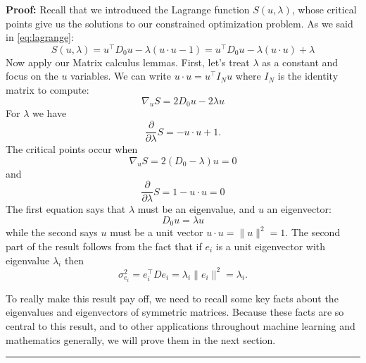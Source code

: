 \documentclass[]{article}
\begin{document}
\textbf{Proof:} Recall that we introduced the Lagrange function
\(S(u,\lambda)\), whose critical points give us the solutions to our
constrained optimization problem. As we said in \cref{eq:lagrange}: \[
S(u,\lambda) = u^{\intercal}D_{0}u - \lambda(u\cdot u - 1) = u^{\intercal}D_{0}u -\lambda(u\cdot u) + \lambda
\] Now apply our Matrix calculus lemmas. First, let's treat \(\lambda\)
as a constant and focus on the \(u\) variables. We can write
\(u\cdot u = u^{\intercal} I_{N} u\) where \(I_{N}\) is the identity
matrix to compute: \[
\nabla_{u} S = 2D_{0}u -2\lambda u
\] For \(\lambda\) we have \[
\frac{\partial}{\partial \lambda}S = -u\cdot u +1.
\] The critical points occur when \[
\nabla_{u} S = 2(D_{0}-\lambda)u = 0
\] and \[
\frac{\partial}{\partial \lambda}S = 1-u\cdot u = 0
\] The first equation says that \(\lambda\) must be an eigenvalue, and
\(u\) an eigenvector: \[
D_{0}u = \lambda u
\] while the second says \(u\) must be a unit vector
\(u\cdot u=\|u\|^2=1\). The second part of the result follows from the
fact that if \(e_{i}\) is a unit eigenvector with eigenvalue
\(\lambda_{i}\) then \[
\sigma_{e_{i}}^2 = e_{i}^{\intercal}De_{i} = \lambda_{i}\|e_{i}\|^2=\lambda_{i}.
\]

To really make this result pay off, we need to recall some key facts
about the eigenvalues and eigenvectors of symmetric matrices. Because
these facts are so central to this result, and to other applications
throughout machine learning and mathematics generally, we will prove
them in the next section.

\begin{center}\rule{0.5\linewidth}{\linethickness}\end{center}
\end{document}
